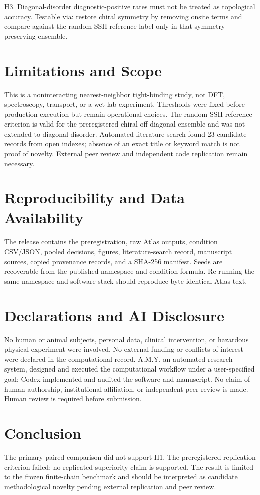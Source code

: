 \documentclass[11pt,a4paper]{article}
\begin{document}
H3. Diagonal-disorder diagnostic-positive rates must not be treated as topological accuracy. Testable via: restore chiral symmetry by removing onsite terms and compare against the random-SSH reference label only in that symmetry-preserving ensemble.


\section{Limitations and Scope}
This is a noninteracting nearest-neighbor tight-binding study, not DFT, spectroscopy, transport, or a wet-lab experiment. Thresholds were fixed before production execution but remain operational choices. The random-SSH reference criterion is valid for the preregistered chiral off-diagonal ensemble and was not extended to diagonal disorder. Automated literature search found 23 candidate records from open indexes; absence of an exact title or keyword match is not proof of novelty. External peer review and independent code replication remain necessary.


\section{Reproducibility and Data Availability}
The release contains the preregistration, raw Atlas outputs, condition CSV/JSON, pooled decisions, figures, literature-search record, manuscript sources, copied provenance records, and a SHA-256 manifest. Seeds are recoverable from the published namespace and condition formula. Re-running the same namespace and software stack should reproduce byte-identical Atlas text.


\section{Declarations and AI Disclosure}
No human or animal subjects, personal data, clinical intervention, or hazardous physical experiment were involved. No external funding or conflicts of interest were declared in the computational record. A.M.Y, an automated research system, designed and executed the computational workflow under a user-specified goal; Codex implemented and audited the software and manuscript. No claim of human authorship, institutional affiliation, or independent peer review is made. Human review is required before submission.


\section{Conclusion}
The primary paired comparison did not support H1. The preregistered replication criterion failed; no replicated superiority claim is supported. The result is limited to the frozen finite-chain benchmark and should be interpreted as candidate methodological novelty pending external replication and peer review.
\end{document}
